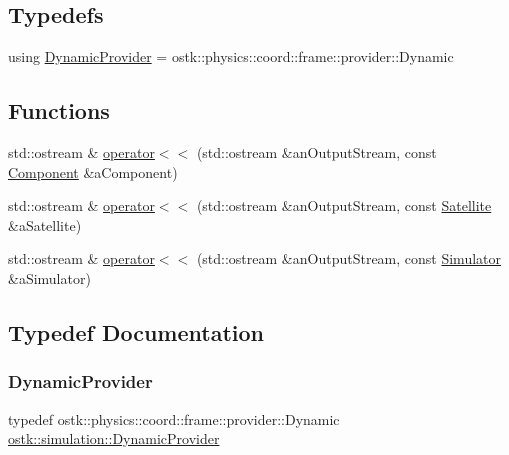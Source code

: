 \subsection*{Typedefs}
\begin{DoxyCompactItemize}
\item 
using \hyperlink{namespaceostk_1_1simulation_acdb581377adb65cc4f2d1d3f527998ca}{Dynamic\+Provider} = ostk\+::physics\+::coord\+::frame\+::provider\+::\+Dynamic
\end{DoxyCompactItemize}
\subsection*{Functions}
\begin{DoxyCompactItemize}
\item 
std\+::ostream \& \hyperlink{namespaceostk_1_1simulation_af73818b9147e934ef1e008c0a731d0b8}{operator$<$$<$} (std\+::ostream \&an\+Output\+Stream, const \hyperlink{classostk_1_1simulation_1_1_component}{Component} \&a\+Component)
\item 
std\+::ostream \& \hyperlink{namespaceostk_1_1simulation_ae6f39d8d153b897714c1d305f2077a5a}{operator$<$$<$} (std\+::ostream \&an\+Output\+Stream, const \hyperlink{classostk_1_1simulation_1_1_satellite}{Satellite} \&a\+Satellite)
\item 
std\+::ostream \& \hyperlink{namespaceostk_1_1simulation_ac688118495593f25aeed155ae2da4f2c}{operator$<$$<$} (std\+::ostream \&an\+Output\+Stream, const \hyperlink{classostk_1_1simulation_1_1_simulator}{Simulator} \&a\+Simulator)
\end{DoxyCompactItemize}


\subsection{Typedef Documentation}
\mbox{\label{namespaceostk_1_1simulation_acdb581377adb65cc4f2d1d3f527998ca}} 
\subsubsection{\texorpdfstring{Dynamic\+Provider}{DynamicProvider}}
{\footnotesize\ttfamily typedef ostk\+::physics\+::coord\+::frame\+::provider\+::\+Dynamic \hyperlink{namespaceostk_1_1simulation_acdb581377adb65cc4f2d1d3f527998ca}{ostk\+::simulation\+::\+Dynamic\+Provider}}



